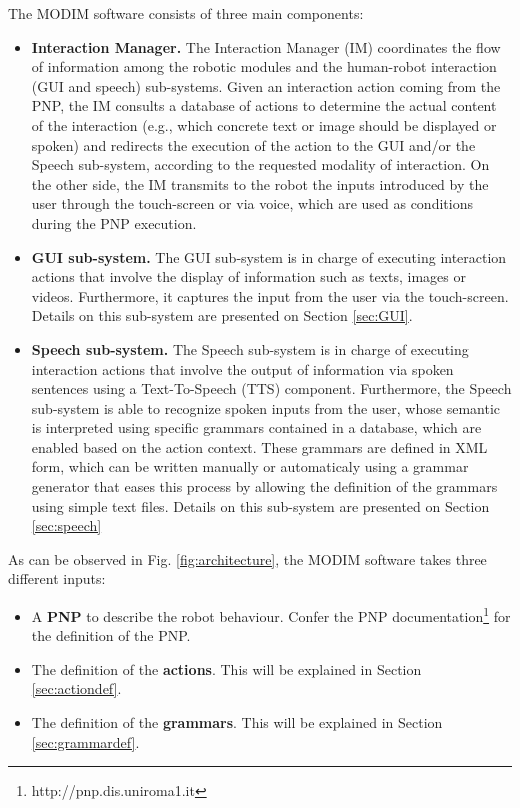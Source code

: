 \documentclass[11pt,a4paper]{article}
\begin{document}
The MODIM software consists of three main components:
\begin{itemize}
\item \textbf{Interaction Manager.} The Interaction Manager (IM) coordinates the flow of information among the robotic modules and the human-robot interaction (GUI and speech) sub-systems. Given an interaction action coming from the PNP, the IM consults a database of actions to determine the actual content of the interaction (e.g., which concrete text or image should be displayed or spoken) and redirects the execution of the action to the GUI and/or the Speech sub-system, according to the requested modality of interaction. On the other side, the IM transmits to the robot the inputs introduced by the user through the touch-screen or via voice, which are used as conditions during the PNP execution.

\item \textbf{GUI sub-system.} The GUI sub-system is in charge of executing interaction actions that involve the display of information such as texts, images or videos. Furthermore, it captures the input from the user via the touch-screen.
Details on this sub-system are presented on Section \ref{sec:GUI}.
\item \textbf{Speech sub-system.} The Speech sub-system is in charge of executing interaction actions that involve the output of information via spoken sentences using a Text-To-Speech (TTS) component. Furthermore, the Speech sub-system is able to recognize spoken inputs from the user, whose semantic is interpreted using specific grammars contained in a database, which are enabled based on the action context. These grammars are defined in XML form, which can be written manually or automaticaly using a grammar generator that eases this process by allowing the definition of the grammars using simple text files.
Details on this sub-system are presented on Section \ref{sec:speech}
\end{itemize}

As can be observed in Fig. \ref{fig:architecture}, the MODIM software takes three different inputs: 
\begin{itemize}
\item A \textbf{PNP} to describe the robot behaviour. Confer the PNP documentation\footnote{http://pnp.dis.uniroma1.it} for the definition of the PNP.
\item The definition of the \textbf{actions}. This will be explained in Section \ref{sec:actiondef}.
\item The definition of the \textbf{grammars}. This will be explained in Section \ref{sec:grammardef}.
\end{itemize}
\end{document}
